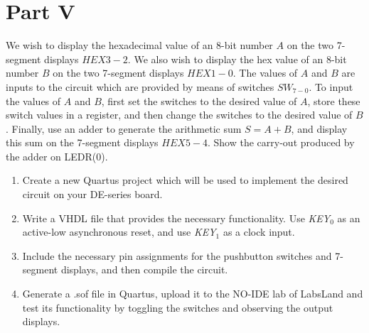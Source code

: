 \documentclass[epsfig,10pt,fullpage]{article}
\newcommand{\CommonDocsPath}{../../../common/docs}
\begin{document}
\section*{Part V}
We wish to display the hexadecimal value of an 8-bit number $A$
on the two 7-segment displays $HEX3-2$.  We also wish to display the
hex value of an 8-bit number $B$ on the two 7-segment displays $HEX1-0$. 
The values of $A$ and $B$ are inputs to the circuit which are
provided by means of switches $SW_{7-0}$.  To input the values of $A$ and $B$, 
first set the switches to the desired value of $A$, store these switch values in a register, 
and then change the switches to the desired value of $B$.  Finally, use an adder to 
generate the arithmetic sum $S = A + B$, and display this sum on the 7-segment 
displays $HEX5-4$. Show the carry-out produced by the adder on LEDR(0).
\begin{enumerate}
\item Create a new Quartus project which will be used to implement the desired
circuit on your DE-series board.
\item Write a VHDL file that provides the necessary functionality. Use {\it KEY}$_0$ as
an active-low asynchronous reset, and use {\it KEY}$_1$ as a clock input.
\item Include the necessary pin assignments for the pushbutton switches and 7-segment
displays, and then compile the circuit.
\item Generate a .sof file in Quartus, upload it to the NO-IDE lab of LabsLand and test its functionality 
by toggling the switches and observing the output displays.
\end{enumerate}




\end{document}
